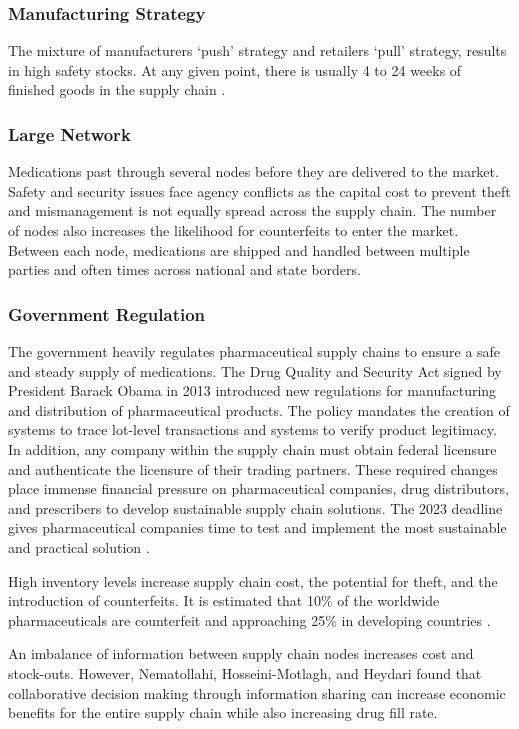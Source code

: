 \documentclass[sigconf]{acmart}
\begin{document}
\subsubsection{Manufacturing Strategy} The mixture of manufacturers `push' strategy and retailers `pull' strategy, results in high safety stocks. At any given point, there is usually 4 to 24 weeks of finished goods in the supply chain  \cite{Shah01}. 
\subsubsection{Large Network} Medications past through several nodes before they are delivered to the market. Safety and security issues face agency conflicts as the capital cost to prevent theft and mismanagement is not equally spread across the supply chain. The number of nodes also increases the likelihood for counterfeits to enter the market. Between each node, medications are shipped and handled between multiple parties and often times across national and state borders.
\subsubsection{Government Regulation} The government heavily regulates pharmaceutical supply chains to ensure a safe and steady supply of medications. The Drug Quality and Security Act signed by President Barack Obama in 2013 introduced new regulations for manufacturing and distribution of pharmaceutical products. The policy mandates the creation of systems to trace lot-level transactions and systems to verify product legitimacy. In addition, any company within the supply chain must obtain federal licensure and authenticate the licensure of their trading partners. These required changes place immense financial pressure on pharmaceutical companies, drug distributors, and prescribers to develop sustainable supply chain solutions. The 2023 deadline gives pharmaceutical companies time to test and implement the most sustainable and practical solution \cite{opsis8}.

High inventory levels increase supply chain cost, the potential for theft, and the introduction of counterfeits. It is estimated that 10\% of the worldwide pharmaceuticals are counterfeit and approaching 25\% in developing countries \cite{Kelesidis01}. 

An imbalance of information between supply chain nodes increases cost and stock-outs. However, Nematollahi, Hosseini-Motlagh, and Heydari \cite{Nematollahi01} found that collaborative decision making through information sharing can increase economic benefits for the entire supply chain while also increasing drug fill rate.
\end{document}
